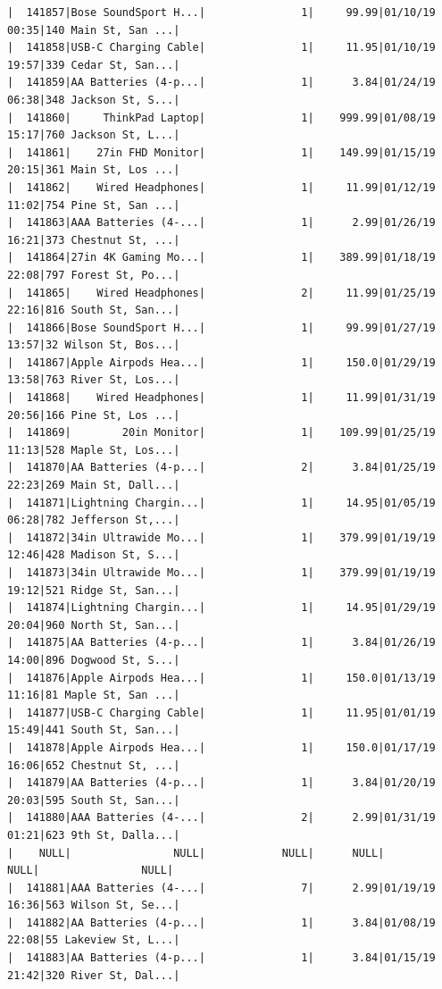 \documentclass[
  letterpaper,
  DIV=11,
  numbers=noendperiod]{scrartcl}
\begin{document}
\begin{verbatim}
|  141857|Bose SoundSport H...|               1|     99.99|01/10/19 00:35|140 Main St, San ...|
|  141858|USB-C Charging Cable|               1|     11.95|01/10/19 19:57|339 Cedar St, San...|
|  141859|AA Batteries (4-p...|               1|      3.84|01/24/19 06:38|348 Jackson St, S...|
|  141860|     ThinkPad Laptop|               1|    999.99|01/08/19 15:17|760 Jackson St, L...|
|  141861|    27in FHD Monitor|               1|    149.99|01/15/19 20:15|361 Main St, Los ...|
|  141862|    Wired Headphones|               1|     11.99|01/12/19 11:02|754 Pine St, San ...|
|  141863|AAA Batteries (4-...|               1|      2.99|01/26/19 16:21|373 Chestnut St, ...|
|  141864|27in 4K Gaming Mo...|               1|    389.99|01/18/19 22:08|797 Forest St, Po...|
|  141865|    Wired Headphones|               2|     11.99|01/25/19 22:16|816 South St, San...|
|  141866|Bose SoundSport H...|               1|     99.99|01/27/19 13:57|32 Wilson St, Bos...|
|  141867|Apple Airpods Hea...|               1|     150.0|01/29/19 13:58|763 River St, Los...|
|  141868|    Wired Headphones|               1|     11.99|01/31/19 20:56|166 Pine St, Los ...|
|  141869|        20in Monitor|               1|    109.99|01/25/19 11:13|528 Maple St, Los...|
|  141870|AA Batteries (4-p...|               2|      3.84|01/25/19 22:23|269 Main St, Dall...|
|  141871|Lightning Chargin...|               1|     14.95|01/05/19 06:28|782 Jefferson St,...|
|  141872|34in Ultrawide Mo...|               1|    379.99|01/19/19 12:46|428 Madison St, S...|
|  141873|34in Ultrawide Mo...|               1|    379.99|01/19/19 19:12|521 Ridge St, San...|
|  141874|Lightning Chargin...|               1|     14.95|01/29/19 20:04|960 North St, San...|
|  141875|AA Batteries (4-p...|               1|      3.84|01/26/19 14:00|896 Dogwood St, S...|
|  141876|Apple Airpods Hea...|               1|     150.0|01/13/19 11:16|81 Maple St, San ...|
|  141877|USB-C Charging Cable|               1|     11.95|01/01/19 15:49|441 South St, San...|
|  141878|Apple Airpods Hea...|               1|     150.0|01/17/19 16:06|652 Chestnut St, ...|
|  141879|AA Batteries (4-p...|               1|      3.84|01/20/19 20:03|595 South St, San...|
|  141880|AAA Batteries (4-...|               2|      2.99|01/31/19 01:21|623 9th St, Dalla...|
|    NULL|                NULL|            NULL|      NULL|          NULL|                NULL|
|  141881|AAA Batteries (4-...|               7|      2.99|01/19/19 16:36|563 Wilson St, Se...|
|  141882|AA Batteries (4-p...|               1|      3.84|01/08/19 22:08|55 Lakeview St, L...|
|  141883|AA Batteries (4-p...|               1|      3.84|01/15/19 21:42|320 River St, Dal...|

\end{verbatim}
\end{document}
